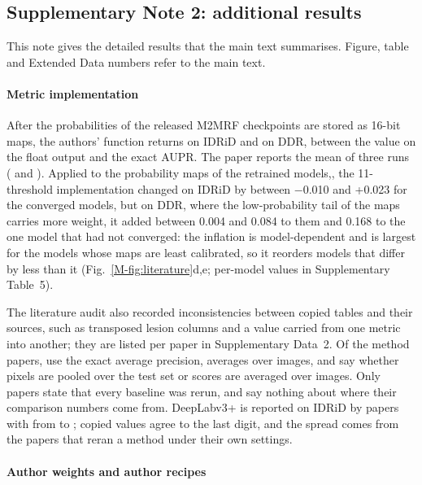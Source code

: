 \subsection*{Supplementary Note 2: additional results}
This note gives the detailed results that the main text summarises. Figure, table and Extended Data numbers refer to the main text.

\paragraph{Metric implementation}

After the probabilities of the released M2MRF checkpoints are stored as 16-bit maps, the authors' function returns  on IDRiD and  on DDR, between the value on the float output and the exact AUPR. The paper reports the mean of three runs ( and ). Applied to the probability maps of the retrained models,, the 11-threshold implementation changed \mAUPR{} on IDRiD by between $-$0.010 and +0.023 for the converged models, but on DDR, where the low-probability tail of the maps carries more weight, it added between 0.004 and 0.084 to them and 0.168 to the one model that had not converged: the inflation is model-dependent and is largest for the models whose maps are least calibrated, so it reorders models that differ by less than it (Fig.~\ref{M-fig:literature}d,e; per-model values in Supplementary Table~5).

The literature audit also recorded inconsistencies between copied tables and their sources, such as transposed lesion columns and a value carried from one metric into another; they are listed per paper in Supplementary Data~2. Of the method papers,  use the exact average precision,  averages over images, and  say whether pixels are pooled over the test set or scores are averaged over images. Only  papers state that every baseline was rerun, and  say nothing about where their comparison numbers come from. DeepLabv3+ is reported on IDRiD by  papers with \mAUPR{} from  to ; copied values agree to the last digit, and the spread comes from the papers that reran a method under their own settings.

\paragraph{Author weights and author recipes}

